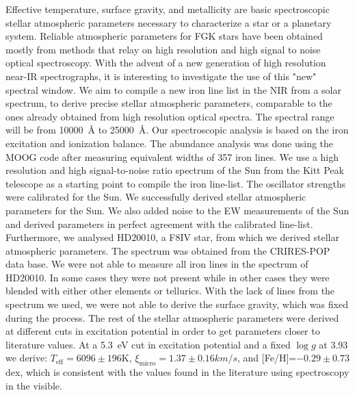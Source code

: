 \documentclass{aa}
\begin{document}
\abstract
{Effective temperature, surface gravity, and metallicity are basic
spectroscopic stellar atmospheric parameters necessary to characterize
a star or a planetary system. Reliable atmospheric parameters for
FGK stars have been obtained mostly from methods that relay on high
resolution and high signal to noise optical spectroscopy. With the
advent of a new generation of high resolution near-IR spectrographs, it
is interesting to investigate the use of this "new" spectral window.}
{We aim to compile a new iron line list in the NIR from a solar
spectrum, to derive precise stellar atmospheric parameters,
comparable to the ones already obtained from high resolution optical
spectra. The spectral range will be from \SI{10000}{\angstrom} to
\SI{25000}{\angstrom}.}
{Our spectroscopic analysis is based on the iron excitation and
ionization balance. The abundance analysis was done using the MOOG code
after measuring equivalent widths of 357 iron lines. We use a high
resolution and high signal-to-noise ratio spectrum of the Sun from the
Kitt Peak telescope as a starting point to compile the iron line-list.
The oscillator strengths were calibrated for the Sun.}
{We successfully derived stellar atmospheric parameters for the Sun.
We also added noise to the EW measurements of the Sun and derived
parameters in perfect agreement with the calibrated line-list.
Furthermore, we analysed HD20010, a F8IV star, from which we derived
stellar atmospheric parameters. The spectrum was obtained from the
CRIRES-POP data base. We were not able to measure all iron lines in
the spectrum of HD20010. In some cases they were not present while in
other cases they were blended with either other elements or tellurics.
With the lack of  lines from the spectrum we used, we were
not able to derive the surface gravity, which was fixed during the
process. The rest of the stellar atmospheric parameters were derived at
different cuts in excitation potential in order to get parameters closer
to literature values. At a \SI{5.3}{eV} cut in excitation potential
and a fixed $\log g$ at 3.93 we derive: $T_\mathrm{eff}=6096\pm196$K,
$\xi_\mathrm{micro}=1.37\pm0.16\si{km/s}$, and [Fe/H]=$-0.29\pm0.73$
dex, which is consistent with the values found in the literature using
spectroscopy in the visible.}
{}



\maketitle
\end{document}
